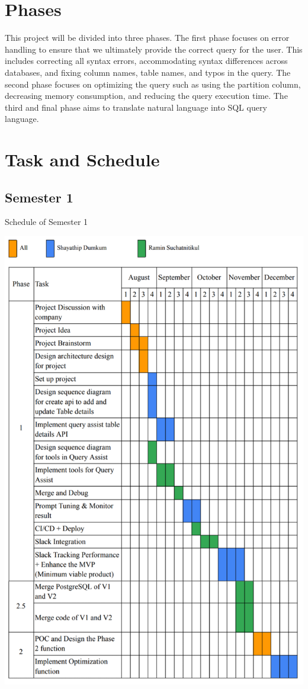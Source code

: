 \section{Phases}
This project will be divided into three phases. The first phase focuses on error handling to ensure that we ultimately provide the correct query for the user. This includes correcting all syntax errors, accommodating syntax differences across databases, and fixing column names, table names, and typos in the query. The second phase focuses on optimizing the query such as using the partition column, decreasing memory consumption, and reducing the query execution time. The third and final phase aims to translate natural language into SQL query language.

\section{Task and Schedule}
    \subsection{Semester 1}
    \begin{table}[H]
        \centering
        \caption{Schedule of Semester 1}\label{tbl:schedule}
        \includegraphics[width=15cm]{chapters/1/figures/plan.png}
    \end{table}

